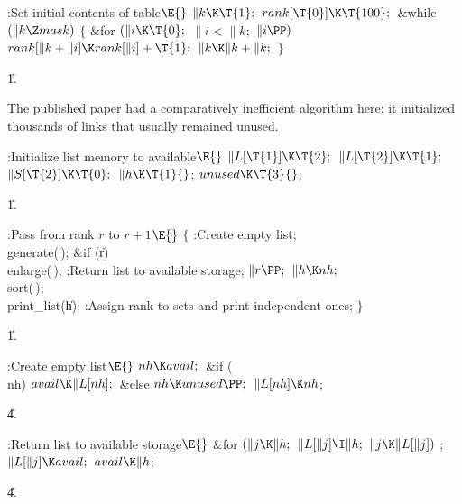 \B{}:Set initial contents of  table\X${}\E{}$\6
$\|k\K\T{1};{}$\6
${}\\{rank}[\T{0}]\K\T{100};{}$\6
\&{while} ${}(\|k\Z\\{mask}){}$\5
${}\{{}$\1\6
\&{for} ${}(\|i\K\T{0};{}$ ${}\|i<\|k;{}$ ${}\|i\PP){}$\1\5
${}\\{rank}[\|k+\|i]\K\\{rank}[\|i]+\T{1};{}$\2\6
${}\|k\K\|k+\|k;{}$\6
\4${}\}{}$\2\par
\U1.\fi

The published paper had a comparatively inefficient algorithm here;
it initialized thousands of links that usually remained unused.

\Y\B\4:Initialize list memory to available\X${}\E{}$\6
$\|L[\T{1}]\K\T{2};{}$\6
${}\|L[\T{2}]\K\T{1};{}$\6
${}\|S[\T{2}]\K\T{0};{}$\6
${}\|h\K\T{1}{}$;\6
${}\\{unused}\K\T{3}{}$;\par
\U1.\fi

\B{}:Pass from rank $r$ to $r+1$\X${}\E{}$\6
${}\{{}$\1\6
:Create empty list\X;\6
\\{generate}(\,);\6
\&{if} (\|r)\1\5
\\{enlarge}(\,);\2\6
:Return list  to available storage\X;\6
${}\|r\PP;{}$\6
${}\|h\K\\{nh};{}$\6
\\{sort}(\,);\6
\\{print\_list}(\|h);\6
:Assign rank to sets and print independent ones\X;\6
\4${}\}{}$\2\par
\U1.\fi

\B{}:Create empty list\X${}\E{}$\6
$\\{nh}\K\\{avail};{}$\6
\&{if} (\\{nh})\1\5
${}\\{avail}\K\|L[\\{nh}];{}$\2\6
\&{else}\1\5
${}\\{nh}\K\\{unused}\PP;{}$\2\6
${}\|L[\\{nh}]\K\\{nh}{}$;\par
\U4.\fi

\B{}:Return list  to available storage\X${}\E{}$\6
\&{for} ${}(\|j\K\|h;{}$ ${}\|L[\|j]\I\|h;{}$ ${}\|j\K\|L[\|j]){}$\1\5
;\2\6
${}\|L[\|j]\K\\{avail};{}$\6
${}\\{avail}\K\|h{}$;\par
\U4.\fi

